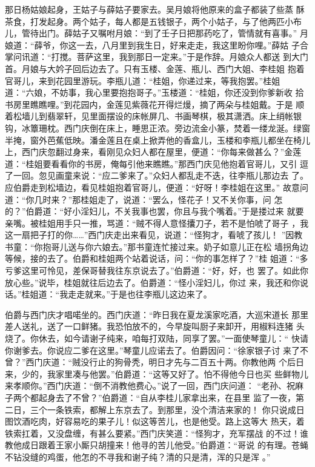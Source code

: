那日杨姑娘起身，王姑子与薛姑子要家去。吴月娘将他原来的盒子都装了些蒸
酥茶食，打发起身。两个姑子，每人都是五钱银子，两个小姑子，与了他两匹小布
儿，管待出门。薛姑子又嘱咐月娘：“到了壬子日把那药吃了，管情就有喜事。”
月娘道：“薛爷，你这一去，八月里到我生日，好来走走，我这里盼你哩。”薛姑
子合掌问讯道：“打搅。菩萨这里，我到那日一定来。”于是作辞。月娘众人都送
到大门首。月娘与大妗子回后边去了。只有玉楼、金莲、瓶儿、西门大姐、李桂姐
抱着官哥儿，来到花园里游玩。李瓶儿道：“桂姐，你递过来，等我抱罢。”桂姐
道：“六娘，不妨事，我心里要抱抱哥子。”玉楼道：“桂姐，你还没到你爹新收
拾书房里瞧瞧哩。”到花园内，金莲见紫薇花开得烂熳，摘了两朵与桂姐戴。于是
顺着松墙儿到翡翠轩，见里面摆设的床帐屏几、书画琴棋，极其潇洒。床上绡帐银
钩，冰簟珊枕。西门庆倒在床上，睡思正浓。旁边流金小篆，焚着一缕龙涎。绿窗
半掩，窗外芭蕉低映。潘金莲且在桌上掀弄他的香盒儿，玉楼和李瓶儿都坐在椅儿
上，西门庆忽翻过身来，看刚见众妇人都在屋里，便道：“你每来做甚么？”金莲
道：“桂姐要看看你的书房，俺每引他来瞧瞧。”那西门庆见他抱着官哥儿，又引
逗了一回。忽见画童来说：“应二爹来了。”众妇人都乱走不迭，往李瓶儿那边去
了。应伯爵走到松墙边，看见桂姐抱着官哥儿，便道：“好呀！李桂姐在这里。”
故意问道：“你几时来？”那桂姐走了，说道：“罢么，怪花子！又不关你事，问
怎的？”伯爵道：“好小淫妇儿，不关我事也罢，你且与我个嘴着。”于是搂过来
就要亲嘴。被桂姐用手只一推，骂道：“贼不得人意怪攮刀子，若不是怕唬了哥子
，我这一扇把子打的你……”西门庆走出来看见，说道：“怪狗才，看唬了孩儿！
”因教书童：“你抱哥儿送与你六娘去。”那书童连忙接过来。奶子如意儿正在松
墙拐角边等候，接的去了。伯爵和桂姐两个站着说话，问：“你的事怎样了？”桂
姐道：“多亏爹这里可怜见，差保哥替我往东京说去了。”伯爵道：“好，好，也
罢了。如此你放心些。”说毕，桂姐就往后边去了。伯爵道：“怪小淫妇儿，你过
来，我还和你说话。”桂姐道：“我走走就来。”于是也往李瓶儿这边来了。

伯爵与西门庆才唱喏坐的。西门庆道：“昨日我在夏龙溪家吃酒，大巡宋道长
那里差人送礼，送了一口鲜猪。我恐怕放不的，今早旋叫厨子来卸开，用椒料连猪
头烧了。你休去，如今请谢子纯来，咱每打双陆，同享了罢。”一面使琴童儿：“
快请你谢爹去。你说应二爹在这里。”琴童儿应诺去了。伯爵因问：“徐家银子讨
来了不曾？”西门庆道：“贼没行止的狗骨秃，明日才先与二百五十两。你教他两
个后日来，少的，我家里凑与他罢。”伯爵道：“这等又好了。怕不得他今日也买
些鲜物儿来孝顺你。”西门庆道：“倒不消教他费心。”说了一回，西门庆问道：
“老孙、祝麻子两个都起身去了不曾？”伯爵道：“自从李桂儿家拿出来，在县里
监了一夜，第二日，三个一条铁索，都解上东京去了。到那里，没个清洁来家的！
你只说成日图饮酒吃肉，好容易吃的果子儿！似这等苦儿，也是他受。路上这等大
热天，着铁索扛着，又没盘缠，有甚么要紧。”西门庆笑道：“怪狗才，充军摆战
的不过！谁教他成日跟着王家小厮只胡撞来！他寻的苦儿他受。”伯爵道：“哥说
的有理。苍蝇不钻没缝的鸡蛋，他怎的不寻我和谢子纯？清的只是清，浑的只是浑
。”

